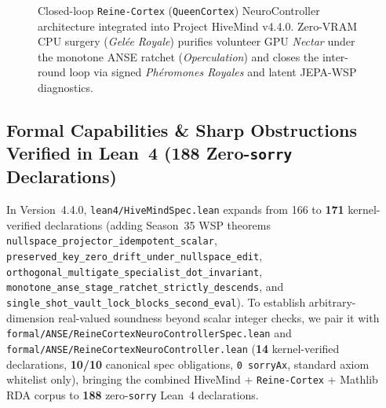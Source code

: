 \documentclass[11pt,a4paper]{article}
\begin{document}
\begin{figure}[htbp!]
{%
}
\caption{Closed-loop \texttt{Reine-Cortex} (\texttt{QueenCortex}) NeuroController architecture integrated into Project HiveMind v4.4.0. Zero-VRAM CPU surgery (\emph{Gel\'ee Royale}) purifies volunteer GPU \emph{Nectar} under the monotone ANSE ratchet (\emph{Operculation}) and closes the inter-round loop via signed \emph{Ph\'eromones Royales} and latent JEPA-WSP diagnostics.}
\label{fig:v440_reine_cortex_arch}
\end{figure}

\subsection{Formal Capabilities \& Sharp Obstructions Verified in Lean~4 (188 Zero-\texttt{sorry} Declarations)}
\label{sec:v440_lean4_theorems}

In Version~4.4.0, \texttt{lean4/HiveMindSpec.lean} expands from 166 to \textbf{171} kernel-verified declarations (adding Season~35 WSP theorems \texttt{nullspace\_projector\_\allowbreak idempotent\_scalar}, \texttt{preserved\_key\_zero\_\allowbreak drift\_under\_\allowbreak nullspace\_edit}, \texttt{orthogonal\_multigate\_\allowbreak specialist\_dot\_invariant}, \texttt{monotone\_anse\_stage\_\allowbreak ratchet\_strictly\_descends}, and \texttt{single\_shot\_vault\_\allowbreak lock\_blocks\_second\_eval}). To establish arbitrary-dimension real-valued soundness beyond scalar integer checks, we pair it with \texttt{formal/ANSE/\allowbreak ReineCortexNeuroControllerSpec.lean} and \texttt{formal/ANSE/\allowbreak ReineCortexNeuroController.lean} (\textbf{14} kernel-verified declarations, \textbf{10/10} canonical spec obligations, \texttt{0 sorryAx}, standard axiom whitelist only), bringing the combined HiveMind + \texttt{Reine-Cortex} + Mathlib RDA corpus to \textbf{188} zero-\texttt{sorry} Lean~4 declarations.
\end{document}
